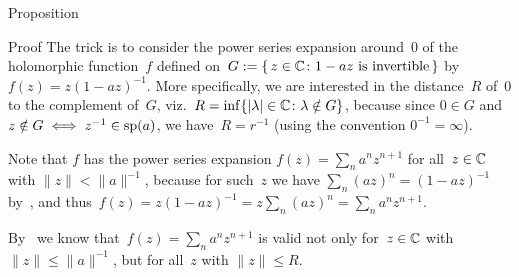 \documentclass[a]{subfiles}
\begin{document}
\begin{parsec}
\begin{point}{Proposition}
\begin{point}{Proof}
The trick is to consider
the power series expansion
around~$0$ of the holomorphic function~$f$ defined
on~$G:=\{\,z\in \mathbb{C}\colon 1-az\text{ is invertible}\,\}$ 
by  $f(z)=z(1-az)^{-1}$.
More specifically,
we are interested in the distance~$R$
of~$0$ to the complement of~$G$,
viz.~$R= \inf\{\left|\lambda\right|\in \mathbb{C}\colon \lambda\notin G\}$,
because since $0\in G$
and $z\notin G\iff z^{-1}\in \mathrm{sp}(a)$,
we have~$R=r^{-1}$
(using the convention $0^{-1}=\infty$).

Note that $f$ has the power series expansion
$f(z) = \sum_n a^nz^{n+1}$
for all~$z\in \mathbb{C}$ with $\|z\|<\|a\|^{-1}$,
because for such~$z$
we have $\sum_n (az)^n=(1-az)^{-1}$
by~,
and thus~$f(z)=z(1-az)^{-1}=z\sum_n (az)^n = \sum_n a^nz^{n+1}$.

By~
we know that~$f(z)=\sum_n a^nz^{n+1}$
is valid not only for~$z\in \mathbb{C}$ with $\|z\|\leq \|a\|^{-1}$,
but for all~$z$ with $\|z\|\leq R$.


\end{point}
\end{point}
\end{parsec}
\end{document}
